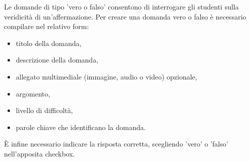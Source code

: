 \documentclass[a4paper, titlepage]{article}
\begin{document}
	 Le domande di tipo 'vero o falso' consentono di interrogare gli studenti sulla veridicità di un'affermazione. 
	 Per creare una domanda vero o falso è necessario compilare nel relativo form:
	 \begin{itemize}
 	 	\item titolo della domanda,
 	 	\item descrizione della domanda,
 	 	\item allegato multimediale (immagine, audio o video) opzionale,
 	 	\item argomento,
 	 	\item livello di difficoltà,
 	 	\item parole chiave che identificano la domanda.
	 \end{itemize}
	 È infine necessario indicare la risposta corretta, scegliendo 'vero' o 'falso' nell'apposita checkbox.

	 
	 \newpage
\end{document}
